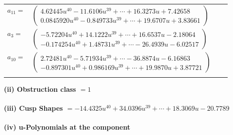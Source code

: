 \documentclass[1p]{elsarticle_modified}
\theoremstyle{definition}
\begin{document}
\begin{tabular}{m{7pt} m{180pt} m{7pt} m{180pt} }
\flushright $a_{11}=$&$\begin{pmatrix}4.62445 u^{40}-11.6106 u^{39}+\cdots+16.3273 u+7.42658\\0.0845920 u^{40}-0.849733 u^{39}+\cdots+19.6707 u+3.83661\end{pmatrix}$ \\
\flushright $a_{3}=$&$\begin{pmatrix}-5.72204 u^{40}+14.1222 u^{39}+\cdots+16.6537 u-2.18064\\-0.174254 u^{40}+1.48731 u^{39}+\cdots-26.4939 u-6.02517\end{pmatrix}$ \\
\flushright $a_{10}=$&$\begin{pmatrix}2.72481 u^{40}-5.71934 u^{39}+\cdots-36.8874 u-6.16863\\-0.897301 u^{40}+0.986169 u^{39}+\cdots+19.9870 u+3.87721\end{pmatrix}$\\&\end{tabular}
\flushleft \textbf{(ii) Obstruction class $= 1$}\\~\\
\flushleft \textbf{(iii) Cusp Shapes $= -14.4325 u^{40}+34.0396 u^{39}+\cdots+18.3069 u-20.7789$}\\~\\
\newpage\renewcommand{\arraystretch}{1}
\flushleft \textbf{(iv) u-Polynomials at the component}\newline \\
\end{document}
